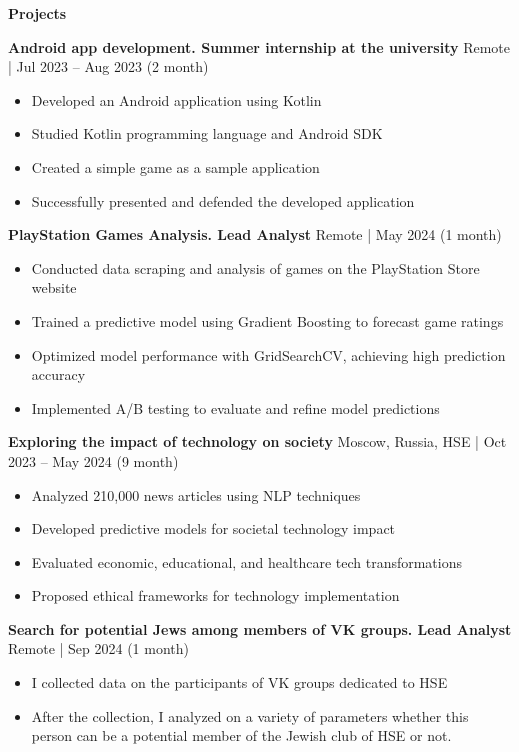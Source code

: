 \begin{center}
    \textbf{Projects}
\end{center}

\textbf{Android app development. Summer internship at the university} \hfill Remote | Jul 2023 – Aug 2023 (2 month)
\begin{itemize}[noitemsep, topsep=0pt, partopsep=0pt, parsep=0pt]
    \item Developed an Android application using Kotlin
    \item Studied Kotlin programming language and Android SDK
    \item Created a simple game as a sample application
    \item Successfully presented and defended the developed application
\end{itemize}

\textbf{PlayStation Games Analysis. Lead Analyst} \hfill Remote | May 2024 (1 month)
\begin{itemize}[noitemsep, topsep=0pt, partopsep=0pt, parsep=0pt]
    \item Conducted data scraping and analysis of games on the PlayStation Store website
    \item Trained a predictive model using Gradient Boosting to forecast game ratings
    \item Optimized model performance with GridSearchCV, achieving high prediction accuracy
    \item Implemented A/B testing to evaluate and refine model predictions
\end{itemize}

\textbf{Exploring the impact of technology on society} \hfill Moscow, Russia, HSE | Oct 2023 – May 2024 (9 month)
\begin{itemize}[noitemsep, topsep=0pt, partopsep=0pt, parsep=0pt]
    \item Analyzed 210,000 news articles using NLP techniques
    \item Developed predictive models for societal technology impact
    \item Evaluated economic, educational, and healthcare tech transformations
    \item Proposed ethical frameworks for technology implementation
\end{itemize}

\textbf{Search for potential Jews among members of VK groups. Lead Analyst} \hfill Remote | Sep 2024 (1 month)
\begin{itemize}[noitemsep, topsep=0pt, partopsep=0pt, parsep=0pt]
    \item I collected data on the participants of VK groups dedicated to HSE
    \item After the collection, I analyzed on a variety of parameters whether this person can be a potential member of the Jewish club of HSE or not.
\end{itemize}

